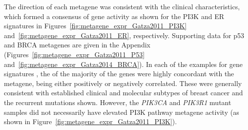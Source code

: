 The direction of each \gls{metagene} was consistent with the clinical characteristics, which formed a consensus of gene activity as shown for the \gls{PI3K} and \gls{ER} signatures \citep{Gatza2011} in Figures~\ref{fig:metagene_expr_Gatza2011_PI3K} and~\ref{fig:metagene_expr_Gatza2011_ER}, respectively.  Supporting data for p53 and BRCA \glspl{metagene} \citep{Gatza2011, Gatza2014} are given in the Appendix (Figures~\ref{fig:metagene_expr_Gatza2011_P53} and~\ref{fig:metagene_expr_Gatza2014_BRCA}). In each of the examples for gene signatures%
, the  of the majority of the genes were highly concordant with the \gls{metagene}, being either positively or negatively correlated. These were generally consistent with established clinical and molecular subtypes of breast cancer and the \glspl{recurrent mutation} shown. However, the \textit{PIK3CA} and \textit{PIK3R1} \gls{mutant} samples did not necessarily have elevated \gls{PI3K} pathway \gls{metagene} activity (as shown in Figure~\ref{fig:metagene_expr_Gatza2011_PI3K}).  


